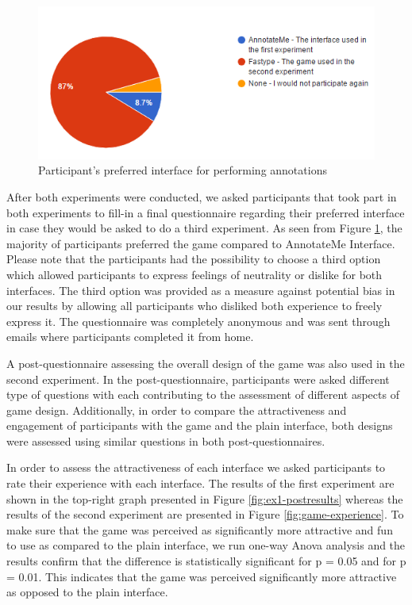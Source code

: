 \begin{figure}[]
    \centering
    \includegraphics[width=\linewidth]{figures/experiment2/participant-preferance.PNG}
    \caption{Participant's preferred interface for performing annotations}
    \label{fig:participants-perference}
\end{figure}

After both experiments were conducted, we asked participants that took part in both experiments to fill-in a final questionnaire regarding their preferred interface in case they would be asked to do a third experiment. As seen from Figure \ref{fig:participants-perference}, the majority of participants preferred the game compared to AnnotateMe Interface. Please note that the participants had the possibility to choose a third option which allowed participants to express feelings of neutrality or dislike for both interfaces. The third option was provided as a measure against potential bias in our results by allowing all participants who disliked both experience to freely express it. The questionnaire was completely anonymous and was sent through emails where participants completed it from home.

A post-questionnaire assessing the overall design of the game was also used in the second experiment. In the post-questionnaire, participants were asked different type of questions with each contributing to the assessment of different aspects of game design. Additionally, in order to compare the attractiveness and engagement of participants with the game and the plain interface, both designs were assessed using similar questions in both post-questionnaires. 

In order to assess the attractiveness of each interface we asked participants to rate their experience with each interface. The results of the first experiment are shown in the top-right graph presented in Figure \ref{fig:ex1-postresults} whereas the results of the second experiment are presented in Figure \ref{fig:game-experience}. To make sure that the game was perceived as significantly more attractive and fun to use as compared to the plain interface, we run one-way Anova analysis and the results confirm that the difference is statistically significant for p = 0.05 and for p = 0.01. This indicates that the game was perceived significantly more attractive as opposed to the plain interface.

